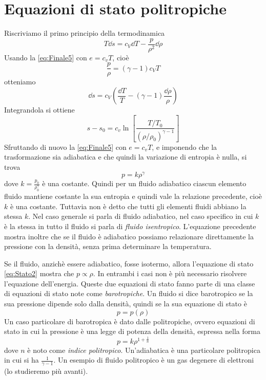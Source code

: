 \section{Equazioni di stato politropiche}
Riscriviamo il primo principio della termodinamica 
\begin{equation}
T \dd s = c_V \dd T - \frac{p}{\rho^2}\dd \rho
\end{equation}
Usando la \ref{eq:Finale5} con $e=c_v T$, cioè 
\begin{equation}
\frac{p}{\rho}= (\gamma -1) c_V T \label{eq:Stato2}
\end{equation}
otteniamo
\begin{equation}
\dd s = c_V \left( \frac{\dd T}{T} - (\gamma -1) \frac{\dd \rho}{\rho} \right)
\end{equation}
Integrandola si ottiene
\begin{equation}
s-s_0 = c_v \ln \left[ \frac{T/T_0}{(\rho / \rho_0)^{\gamma -1}} \right] \label{eq:Isentropica}
\end{equation}
Sfruttando di nuovo la \ref{eq:Finale5} con $e=c_v T$, e imponendo che la trasformazione sia adiabatica e che quindi la variazione di entropia è nulla, si trova
\begin{equation}
p = k \rho^\gamma
\end{equation}
dove $k=\frac{p_0}{\rho_0^\gamma}$ è una costante. Quindi per un fluido adiabatico ciascun elemento fluido mantiene costante la sua entropia e quindi vale la relazione precedente, cioè $k$ è una costante. Tuttavia non è detto che tutti gli elementi fluidi abbiano la stessa $k$. Nel caso generale si parla di fluido adiabatico, nel caso specifico in cui $k$ è la stessa in tutto il fluido si parla di \textit{fluido isentropico}. L'equazione precedente mostra inoltre che se il fluido è adiabatico possiamo relazionare direttamente la pressione con la densità, senza prima determinare la temperatura. 

Se il fluido, anzichè essere adiabatico, fosse isotermo, allora l'equazione di stato \ref{eq:Stato2} mostra che $p\propto \rho $. In entrambi i casi non è più necessario risolvere l'equazione dell'energia. Queste due equazioni di stato fanno parte di una classe di equazioni di stato note come \textit{barotropiche}. Un fluido si dice barotropico se la sua pressione dipende solo dalla densità, quindi se la sua equazione di stato è 
\begin{equation}
p = p(\rho) \label{eq:BarotropicaGenerica}
\end{equation}
Un caso particolare di barotropica è dato dalle politropiche, ovvero equazioni di stato in cui la pressione è una legge di potenza della densità, espressa nella forma
\begin{equation}
p=k \rho^{1+\frac{1}{n}}
\end{equation}
dove $n$ è noto come \textit{indice politropico}. Un'adiabatica è una particolare politropica in cui si ha $\frac{1}{\gamma -1}$. Un esempio di fluido politropico è un gas degenere di elettroni (lo studieremo più avanti).


